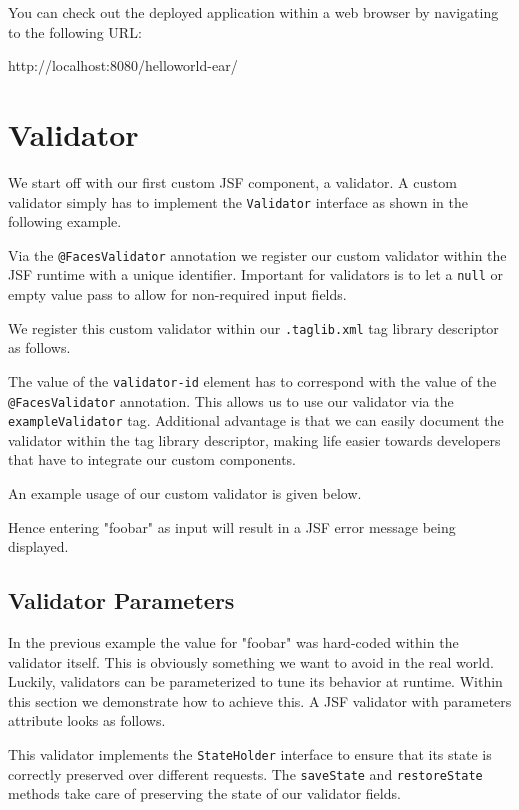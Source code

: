 You can check out the deployed application within a web browser by navigating to the following URL:

http://localhost:8080/helloworld-ear/

\section{Validator}
\label{sec:validator}
We start off with our first custom JSF component, a validator.
A custom validator simply has to implement the \texttt{Validator} interface as shown in the following example.

Via the \texttt{@FacesValidator} annotation we register our custom validator within the JSF runtime with a unique identifier.
Important for validators is to let a \texttt{null} or empty value pass to allow for non-required input fields.

We register this custom validator within our \texttt{.taglib.xml} tag library descriptor as follows.

The value of the \texttt{validator-id} element has to correspond with the value of the \texttt{@Faces\allowbreak Validator} annotation.
This allows us to use our validator via the \texttt{exampleValidator} tag.
Additional advantage is that we can easily document the validator within the tag library descriptor, making life easier towards developers that have to integrate our custom components.

An example usage of our custom validator is given below.

Hence entering "foobar" as input will result in a JSF error message being displayed.


\subsection{Validator Parameters}
In the previous example the value for "foobar" was hard-coded within the validator itself.
This is obviously something we want to avoid in the real world.
Luckily, validators can be parameterized to tune its behavior at runtime.
Within this section we demonstrate how to achieve this.
A JSF  validator with parameters attribute looks as follows.

This validator implements the \texttt{StateHolder} interface to ensure that its state is correctly preserved over different requests.
The \texttt{saveState} and \texttt{restoreState} methods take care of preserving the state of our validator fields.

